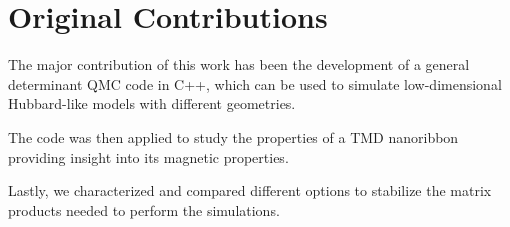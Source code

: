 \section{Original Contributions}
\label{sec:int_contributions}

The major contribution of this work has been the development of a general determinant \ac{QMC} code in C++, which can be used to simulate low-dimensional Hubbard-like models with different geometries.

The code was then applied to study the properties of a \ac{TMD} nanoribbon providing insight into its magnetic properties.

Lastly, we characterized and compared different options to stabilize the matrix products needed to perform the simulations.